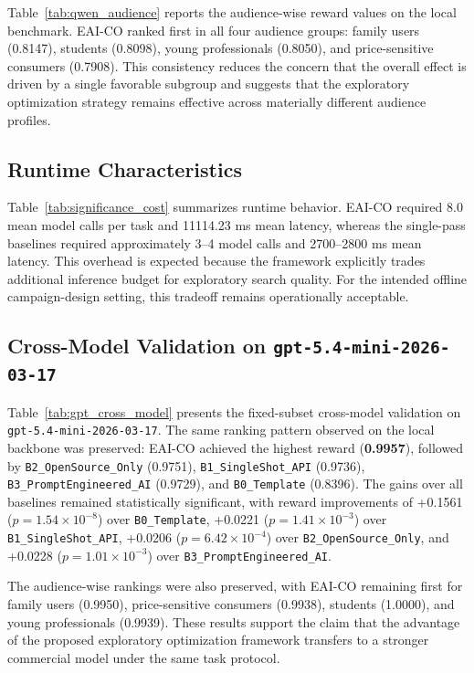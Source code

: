 \documentclass[applsci,article,submit,pdftex,moreauthors]{Definitions/mdpi}
\begin{document}
Table~\ref{tab:qwen_audience} reports the audience-wise reward values on the local benchmark. EAI-CO ranked first in all four audience groups: family users (0.8147), students (0.8098), young professionals (0.8050), and price-sensitive consumers (0.7908). This consistency reduces the concern that the overall effect is driven by a single favorable subgroup and suggests that the exploratory optimization strategy remains effective across materially different audience profiles.

\subsection{Runtime Characteristics}

Table~\ref{tab:significance_cost} summarizes runtime behavior. EAI-CO required 8.0 mean model calls per task and 11114.23 ms mean latency, whereas the single-pass baselines required approximately 3--4 model calls and 2700--2800 ms mean latency. This overhead is expected because the framework explicitly trades additional inference budget for exploratory search quality. For the intended offline campaign-design setting, this tradeoff remains operationally acceptable.

\subsection{Cross-Model Validation on \texttt{gpt-5.4-mini-2026-03-17}}

Table~\ref{tab:gpt_cross_model} presents the fixed-subset cross-model validation on \texttt{gpt-5.4-mini-2026-03-17}. The same ranking pattern observed on the local backbone was preserved: EAI-CO achieved the highest reward (\textbf{0.9957}), followed by \texttt{B2\_OpenSource\_Only} (0.9751), \texttt{B1\_SingleShot\_API} (0.9736), \texttt{B3\_PromptEngineered\_AI} (0.9729), and \texttt{B0\_Template} (0.8396). The gains over all baselines remained statistically significant, with reward improvements of +0.1561 ($p = 1.54 \times 10^{-8}$) over \texttt{B0\_Template}, +0.0221 ($p = 1.41 \times 10^{-3}$) over \texttt{B1\_SingleShot\_API}, +0.0206 ($p = 6.42 \times 10^{-4}$) over \texttt{B2\_OpenSource\_Only}, and +0.0228 ($p = 1.01 \times 10^{-3}$) over \texttt{B3\_PromptEngineered\_AI}.

The audience-wise rankings were also preserved, with EAI-CO remaining first for family users (0.9950), price-sensitive consumers (0.9938), students (1.0000), and young professionals (0.9939). These results support the claim that the advantage of the proposed exploratory optimization framework transfers to a stronger commercial model under the same task protocol.
\end{document}

